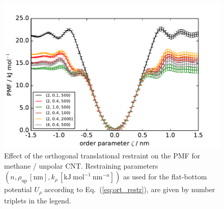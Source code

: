\documentclass[9pt,lessons]{livecoms}
\begin{document}
\begin{figure}[htb!]
\includegraphics[width=\linewidth]{figures/pmf_uCNT_uMeth_transres.pdf}
\caption{
Effect of the orthogonal translational restraint on the PMF for methane / unpolar CNT.
Restraining parameters $(n, \rho_\mathrm{up} \, [\mathrm{nm}], k_\rho \, [\mathrm{kJ~mol}^{-1}~\mathrm{nm}^{-n}])$ as used for the flat-bottom potential $U_\rho$  according to Eq.~(\ref{eq:ort_restr}), 
are given by number triplets in the legend.
}
\label{fig:study_restr_host}
\end{figure}
\end{document}
